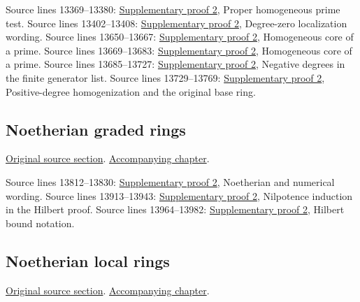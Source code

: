 \begin{AlgebraSourceRoutes}
 Source lines 13369--13380: \hyperlink{algebra_graded_proj_hilbert_notes_20260927}{Supplementary proof 2}, Proper homogeneous prime test.
 Source lines 13402--13408: \hyperlink{algebra_graded_proj_hilbert_notes_20260927}{Supplementary proof 2}, Degree-zero localization wording.
 Source lines 13650--13667: \hyperlink{algebra_graded_proj_hilbert_notes_20260927}{Supplementary proof 2}, Homogeneous core of a prime.
 Source lines 13669--13683: \hyperlink{algebra_graded_proj_hilbert_notes_20260927}{Supplementary proof 2}, Homogeneous core of a prime.
 Source lines 13685--13727: \hyperlink{algebra_graded_proj_hilbert_notes_20260927}{Supplementary proof 2}, Negative degrees in the finite generator list.
 Source lines 13729--13769: \hyperlink{algebra_graded_proj_hilbert_notes_20260927}{Supplementary proof 2}, Positive-degree homogenization and the original base ring.
\end{AlgebraSourceRoutes}

\subsection{Noetherian graded rings}
\hypertarget{algebra-source-section-noetherian-graded}{}
\noindent\href{https://github.com/stacks/stacks-project/blob/a04446e57ec1fbc252a871afcec7752fb2807b14/algebra.tex\#L13774}{Original source section}. \href{algebra.pdf\#nameddest=section-noetherian-graded}{Accompanying chapter}.

\begin{AlgebraSourceRoutes}
 Source lines 13812--13830: \hyperlink{algebra_graded_proj_hilbert_notes_20260927}{Supplementary proof 2}, Noetherian and numerical wording.
 Source lines 13913--13943: \hyperlink{algebra_graded_proj_hilbert_notes_20260927}{Supplementary proof 2}, Nilpotence induction in the Hilbert proof.
 Source lines 13964--13982: \hyperlink{algebra_graded_proj_hilbert_notes_20260927}{Supplementary proof 2}, Hilbert bound notation.
\end{AlgebraSourceRoutes}

\subsection{Noetherian local rings}
\hypertarget{algebra-source-section-Noetherian-local}{}
\noindent\href{https://github.com/stacks/stacks-project/blob/a04446e57ec1fbc252a871afcec7752fb2807b14/algebra.tex\#L13991}{Original source section}. \href{algebra.pdf\#nameddest=section-Noetherian-local}{Accompanying chapter}.

